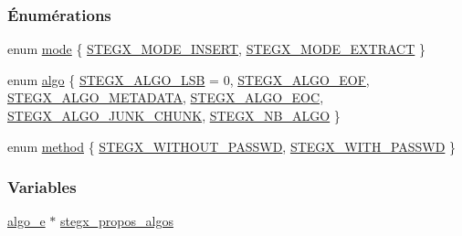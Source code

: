 \subsubsection*{Énumérations}
\begin{DoxyCompactItemize}
\item 
enum \hyperlink{a00008_a1a6b6fb557d8d37d59700faf4e4c9167}{mode} \{ \hyperlink{a00008_a1a6b6fb557d8d37d59700faf4e4c9167a24551ca27f11d8f5a30e8de8d0df7f74}{S\+T\+E\+G\+X\+\_\+\+M\+O\+D\+E\+\_\+\+I\+N\+S\+E\+RT}, 
\hyperlink{a00008_a1a6b6fb557d8d37d59700faf4e4c9167a7e0fef6b5363c352f9652457ddd6328f}{S\+T\+E\+G\+X\+\_\+\+M\+O\+D\+E\+\_\+\+E\+X\+T\+R\+A\+CT}
 \}
\item 
enum \hyperlink{a00008_ad3066b71c7c05f99ce6c3bd88da7ac23}{algo} \{ \newline
\hyperlink{a00008_ad3066b71c7c05f99ce6c3bd88da7ac23a3681255405d19b7e5fb65f0a2ff55bd2}{S\+T\+E\+G\+X\+\_\+\+A\+L\+G\+O\+\_\+\+L\+SB} = 0, 
\hyperlink{a00008_ad3066b71c7c05f99ce6c3bd88da7ac23a6367de53e1c79da0e194a9dbf8d19dea}{S\+T\+E\+G\+X\+\_\+\+A\+L\+G\+O\+\_\+\+E\+OF}, 
\hyperlink{a00008_ad3066b71c7c05f99ce6c3bd88da7ac23a092772fb5d97df32eb904304bbbef80c}{S\+T\+E\+G\+X\+\_\+\+A\+L\+G\+O\+\_\+\+M\+E\+T\+A\+D\+A\+TA}, 
\hyperlink{a00008_ad3066b71c7c05f99ce6c3bd88da7ac23a6072ca50449be645d1e7dbf2d60d97ed}{S\+T\+E\+G\+X\+\_\+\+A\+L\+G\+O\+\_\+\+E\+OC}, 
\newline
\hyperlink{a00008_ad3066b71c7c05f99ce6c3bd88da7ac23a557456be7a623a5c7629c441dad5ddec}{S\+T\+E\+G\+X\+\_\+\+A\+L\+G\+O\+\_\+\+J\+U\+N\+K\+\_\+\+C\+H\+U\+NK}, 
\hyperlink{a00008_ad3066b71c7c05f99ce6c3bd88da7ac23a6266bb55785ce37f799cb062cb11b2a4}{S\+T\+E\+G\+X\+\_\+\+N\+B\+\_\+\+A\+L\+GO}
 \}
\item 
enum \hyperlink{a00008_abed946c62f140eb7ff2ac742e6ad9497}{method} \{ \hyperlink{a00008_abed946c62f140eb7ff2ac742e6ad9497a980af043b0785bf61c3e05f9c9b71eb9}{S\+T\+E\+G\+X\+\_\+\+W\+I\+T\+H\+O\+U\+T\+\_\+\+P\+A\+S\+S\+WD}, 
\hyperlink{a00008_abed946c62f140eb7ff2ac742e6ad9497a7c28dd7cd83fc28a626a0c10f2bccb37}{S\+T\+E\+G\+X\+\_\+\+W\+I\+T\+H\+\_\+\+P\+A\+S\+S\+WD}
 \}
\end{DoxyCompactItemize}
\subsubsection*{Variables}
\begin{DoxyCompactItemize}
\item 
\hyperlink{a00008_adbe3e383e3f1c4239b26ccae2865aa06}{algo\+\_\+e} $\ast$ \hyperlink{a00008_a855163fecb257950934ffba1b73ecae4}{stegx\+\_\+propos\+\_\+algos}
\end{DoxyCompactItemize}


